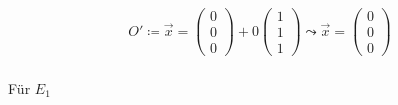 \begin{gather}
	O'\coloneqq \vec{x} = \begin{pmatrix}
	0\\0\\0
	\end{pmatrix}+0 \begin{pmatrix}
		1\\1\\1
	\end{pmatrix} 
\leadsto \vec{x} =
 \begin{pmatrix}
	0\\0\\0
\end{pmatrix}
\end{gather}\\

Für \ensuremath{E_1}

